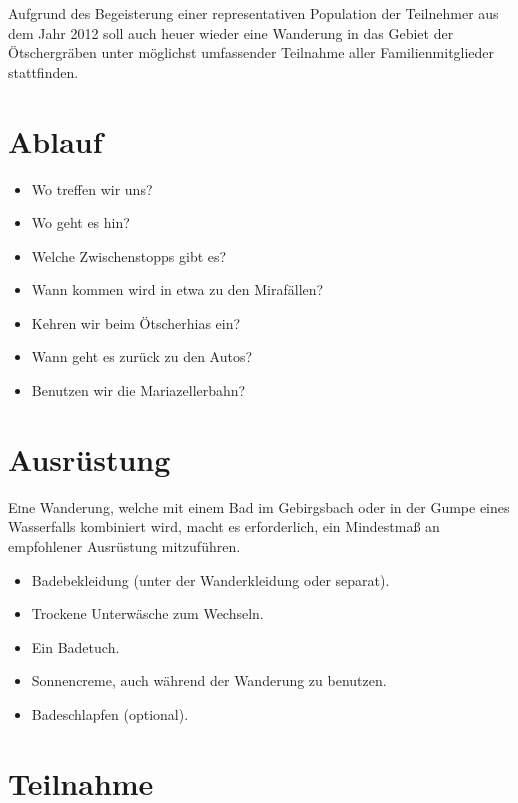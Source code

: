 \documentclass[twoside]{article}
\begin{document}
\begin{multicols}{2}
Aufgrund des Begeisterung einer representativen Population der Teilnehmer aus dem Jahr 2012 soll auch heuer wieder eine Wanderung in das Gebiet der
Ötschergräben unter möglichst umfassender Teilnahme aller Familienmitglieder stattfinden.


\section{Ablauf}

\begin{itemize}
    \item Wo treffen wir uns?
    \item Wo geht es hin?
    \item Welche Zwischenstopps gibt es?
    \item Wann kommen wird in etwa zu den Mirafällen?
    \item Kehren wir beim Ötscherhias ein?
    \item Wann geht es zurück zu den Autos?
    \item Benutzen wir die Mariazellerbahn?
\end{itemize}



\section{Ausrüstung}

\lettrine[nindent=0em,lines=3]{E} ine Wanderung, welche mit einem Bad im Gebirgsbach oder in der Gumpe eines Wasserfalls kombiniert wird, macht es erforderlich,
ein Mindestmaß an empfohlener Ausrüstung mitzuführen.

\begin{itemize}
    \item Badebekleidung (unter der Wanderkleidung oder separat).
    \item Trockene Unterwäsche zum Wechseln.
    \item Ein Badetuch.
    \item Sonnencreme, auch während der Wanderung zu benutzen.
    \item Badeschlapfen (optional).
\end{itemize}


\section{Teilnahme}


\end{multicols}
\end{document}
